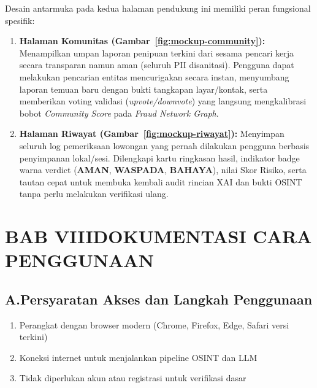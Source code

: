 \documentclass[12pt,a4paper]{article}
\begin{document}
\begin{blokkuning}
\noindent Desain antarmuka pada kedua halaman pendukung ini memiliki peran fungsional spesifik:
\begin{enumerate}[label=\textbf{\arabic*.}]
\item \textbf{Halaman Komunitas (Gambar~\ref{fig:mockup-community}):} Menampilkan umpan laporan penipuan terkini
      dari sesama pencari kerja secara transparan namun aman (seluruh PII disanitasi). Pengguna dapat melakukan
      pencarian entitas mencurigakan secara instan, menyumbang laporan temuan baru dengan bukti tangkapan layar/kontak,
      serta memberikan voting validasi (\textit{upvote/downvote}) yang langsung mengkalibrasi bobot \textit{Community Score}
      pada \textit{Fraud Network Graph}.
\item \textbf{Halaman Riwayat (Gambar~\ref{fig:mockup-riwayat}):} Menyimpan seluruh log pemeriksaan lowongan
      yang pernah dilakukan pengguna berbasis penyimpanan lokal/sesi. Dilengkapi kartu ringkasan hasil, indikator badge
      warna verdict (\textbf{AMAN}, \textbf{WASPADA}, \textbf{BAHAYA}), nilai Skor Risiko, serta tautan cepat untuk
      membuka kembali audit rincian XAI dan bukti OSINT tanpa perlu melakukan verifikasi ulang.
\end{enumerate}

\end{blokkuning}

\section*{BAB VIII\quad DOKUMENTASI CARA PENGGUNAAN}

\subsection*{A.\quad Persyaratan Akses dan Langkah Penggunaan}

\begin{enumerate}[label=\textbf{\arabic*.}]
  \item Perangkat dengan browser modern (Chrome, Firefox, Edge, Safari versi terkini)
  \item Koneksi internet untuk menjalankan pipeline OSINT dan LLM
  \item Tidak diperlukan akun atau registrasi untuk verifikasi dasar
\end{enumerate}
\end{document}
